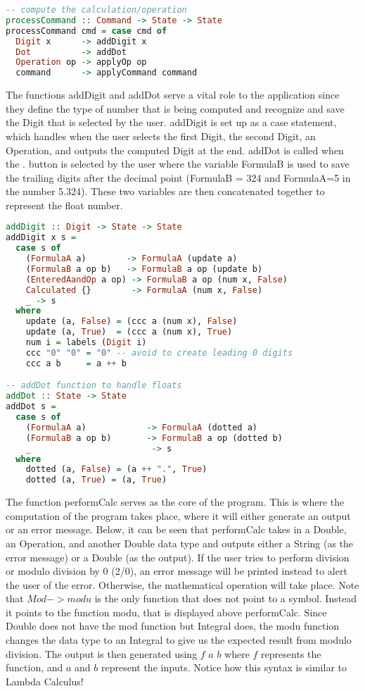 \documentclass{article}
\begin{document}
\begin{lstlisting}[language=Haskell]
-- compute the calculation/operation 
processCommand :: Command -> State -> State
processCommand cmd = case cmd of
  Digit x      -> addDigit x
  Dot          -> addDot
  Operation op -> applyOp op
  command      -> applyCommand command
\end{lstlisting}

\noindent
The functions addDigit and addDot serve a vital role to the application since they define the type of number that is being computed and recognize and save the Digit that is selected by the user. addDigit is set up as a case statement, which handles when the user selects the first Digit, the second Digit, an Operation, and outputs the computed Digit at the end. addDot is called when the $.$ button is selected by the user where the variable FormulaB is used to save the trailing digits after the decimal point (FormulaB = 324 and FormulaA=5 in the number 5.324). These two variables are then concatenated together to represent the float number.

\begin{lstlisting}[language=Haskell]
addDigit :: Digit -> State -> State
addDigit x s =
  case s of
    (FormulaA a)        -> FormulaA (update a)
    (FormulaB a op b)   -> FormulaB a op (update b)
    (EnteredAandOp a op) -> FormulaB a op (num x, False)
    Calculated {}        -> FormulaA (num x, False)
    _ -> s
  where
    update (a, False) = (ccc a (num x), False)
    update (a, True)  = (ccc a (num x), True)   
    num i = labels (Digit i)
    ccc "0" "0" = "0" -- avoid to create leading 0 digits
    ccc a b     = a ++ b

-- addDot function to handle floats
addDot :: State -> State
addDot s =
  case s of
    (FormulaA a)            -> FormulaA (dotted a)
    (FormulaB a op b)       -> FormulaB a op (dotted b)
    _                        -> s
  where
    dotted (a, False) = (a ++ ".", True)
    dotted (a, True) = (a, True)
\end{lstlisting}

\noindent
The function performCalc serves as the core of the program. This is where the computation of the program takes place, where it will either generate an output or an error message. Below, it can be seen that performCalc takes in a Double, an Operation, and another Double data type and outputs either a String (as the error message) or a Double (as the output). If the user tries to perform division or modulo division by 0 (2/0), an error message will be printed instead to alert the user of the error. Otherwise, the mathematical operation will take place. Note that $Mod -> modu$ is the only function that does not point to a symbol. Instead it points to the function modu, that is displayed above performCalc. Since Double does not have the mod function but Integral does, the modu function changes the data type to an Integral to give us the expected result from modulo division. The output is then generated using $f$  $a$  $b$ where $f$ represents the function, and $a$ and $b$ represent the inputs. Notice how this syntax is similar to Lambda Calculus!
\end{document}
